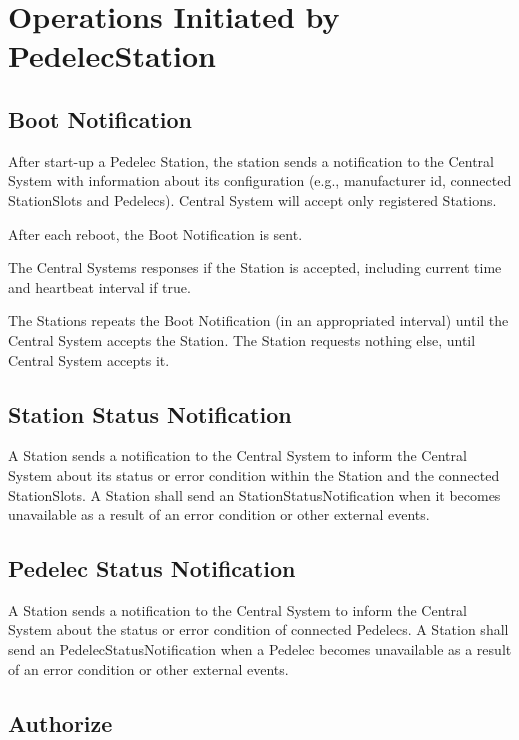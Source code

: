 \section{Operations Initiated by PedelecStation}

\subsection{Boot Notification}

After start-up a Pedelec Station, the station sends a notification to the Central System with information about its configuration (e.g., manufacturer id, connected StationSlots and Pedelecs). Central System will accept only registered Stations. 

After each reboot, the Boot Notification is sent. 

The Central Systems responses if the Station is accepted, including current time and heartbeat interval if true.

The Stations repeats the Boot Notification (in an appropriated interval) until the Central System accepts the Station. The Station requests nothing else, until Central System accepts it.

\subsection{Station Status Notification}

A Station sends a notification to the Central System to inform the Central System about its status or error condition within the Station and the connected StationSlots. A Station shall send an StationStatusNotification when it becomes unavailable as a result of an error condition or other external events.

\subsection{Pedelec Status Notification}

A Station sends a notification to the Central System to inform the Central System about the status or error condition of connected Pedelecs. A Station shall send an PedelecStatusNotification when a Pedelec becomes unavailable as a result of an error condition or other external events.

\subsection{Authorize}

